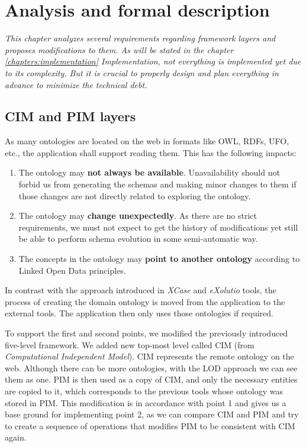 \chapter{Analysis and formal description}
\label{chapters:analysis}

\textit{This chapter analyzes several requirements regarding framework layers and proposes modifications to them. As will be stated in the chapter \ref{chapters:implementation} Implementation, not everything is implemented yet due to its complexity. But it is crucial to properly design and plan everything in advance to minimize the technical debt.}

\section{CIM and PIM layers}

\begin{requirement}
    \label{requirement:ontologies-on-the-web}
    As many ontologies are located on the web in formats like OWL, RDFs, UFO, etc., the application shall support reading them. This has the following impacts:
    \begin{enumerate}
        \item The ontology may \textbf{not always be available}. Unavailability should not forbid us from generating the schemas and making minor changes to them if those changes are not directly related to exploring the ontology.
        \item The ontology may \textbf{change unexpectedly}. As there are no strict requirements, we must not expect to get the history of modifications yet still be able to perform schema evolution in some semi-automatic way.
        \item The concepts in the ontology may \textbf{point to another ontology} according to Linked Open Data principles.
    \end{enumerate}
\end{requirement}

In contrast with the approach introduced in \textit{XCase} and \textit{eXolutio} tools, the process of creating the domain ontology is moved from the application to the external tools. The application then only uses those ontologies if required.

To support the first and second points, we modified the previously introduced five-level framework. We added new top-most level called CIM (from \textit{Computational Independent Model}). CIM represents the remote ontology on the web. Although there can be more ontologies, with the LOD approach we can see them as one. PIM is then used as a copy of CIM, and only the necessary entities are copied to it, which corresponds to the previous tools whose ontology was stored in PIM. This modification is in accordance with point 1 and gives us a base ground for implementing point 2, as we can compare CIM and PIM and try to create a sequence of operations that modifies PIM to be consistent with CIM again.

